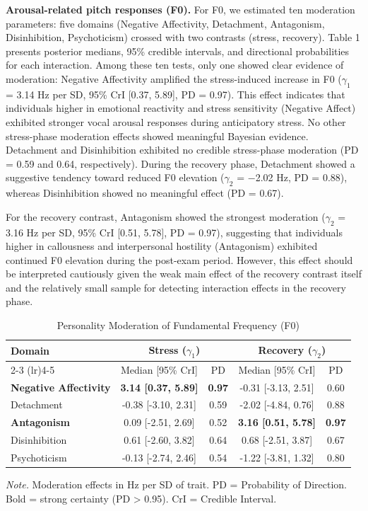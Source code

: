 \documentclass[
  english,
  man]{apa6}
\begin{document}
\textbf{Arousal-related pitch responses (F0).} For F0, we estimated ten moderation parameters: five domains (Negative Affectivity, Detachment, Antagonism, Disinhibition, Psychoticism) crossed with two contrasts (stress, recovery). Table 1 presents posterior medians, 95\% credible intervals, and directional probabilities for each interaction. Among these ten tests, only one showed clear evidence of moderation: Negative Affectivity amplified the stress-induced increase in F0 (\(\gamma_1\) = 3.14 Hz per SD, 95\% CrI {[}0.37, 5.89{]}, PD = 0.97). This effect indicates that individuals higher in emotional reactivity and stress sensitivity (Negative Affect) exhibited stronger vocal arousal responses during anticipatory stress. No other stress-phase moderation effects showed meaningful Bayesian evidence. Detachment and Disinhibition exhibited no credible stress-phase moderation (PD = 0.59 and 0.64, respectively). During the recovery phase, Detachment showed a suggestive tendency toward reduced F0 elevation (\(\gamma_2\) = −2.02 Hz, PD = 0.88), whereas Disinhibition showed no meaningful effect (PD = 0.67).

For the recovery contrast, Antagonism showed the strongest moderation (\(\gamma_2\) = 3.16 Hz per SD, 95\% CrI {[}0.51, 5.78{]}, PD = 0.97), suggesting that individuals higher in callousness and interpersonal hostility (Antagonism) exhibited continued F0 elevation during the post-exam period. However, this effect should be interpreted cautiously given the weak main effect of the recovery contrast itself and the relatively small sample for detecting interaction effects in the recovery phase.

\begin{table}[h]
\caption{Personality Moderation of Fundamental Frequency (F0)}
\label{tab:f0-moderation}
\small
\begin{tabular}{lcccc}
\hline
\multirow{2}{*}{Domain} & \multicolumn{2}{c}{Stress ($\gamma_1$)} & \multicolumn{2}{c}{Recovery ($\gamma_2$)} \\
\cmidrule(lr){2-3} \cmidrule(lr){4-5}
 & Median [95\% CrI] & PD & Median [95\% CrI] & PD \\
\hline
\textbf{Negative Affectivity} & \textbf{3.14 [0.37, 5.89]} & \textbf{0.97} & -0.31 [-3.13, 2.51] & 0.60 \\
Detachment & -0.38 [-3.10, 2.31] & 0.59 & -2.02 [-4.84, 0.76] & 0.88 \\
\textbf{Antagonism} & 0.09 [-2.51, 2.69] & 0.52 & \textbf{3.16 [0.51, 5.78]} & \textbf{0.97} \\
Disinhibition & 0.61 [-2.60, 3.82] & 0.64 & 0.68 [-2.51, 3.87] & 0.67 \\
Psychoticism & -0.13 [-2.74, 2.46] & 0.54 & -1.22 [-3.81, 1.32] & 0.80 \\
\hline
\end{tabular}
\begin{tablenotes}
\small
\item \textit{Note.} Moderation effects in Hz per SD of trait. PD = Probability of Direction. Bold = strong certainty (PD > 0.95). CrI = Credible Interval.
\end{tablenotes}
\end{table}
\end{document}
